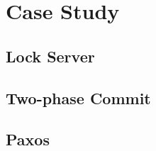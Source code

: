 
\section{Case Study}  \label{section:case-study}

\subsection{Lock Server} \label{ss:lock-server}

\subsection{Two-phase Commit} \label{ss:2pc}

\subsection{Paxos} \label{ss:paxos}

